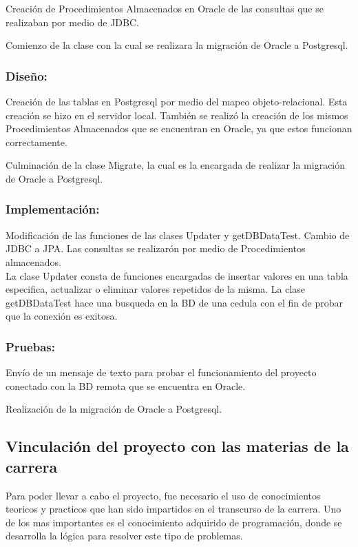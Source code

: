 \documentclass[spanish]{article}
\begin{document}
Creación de Procedimientos Almacenados en Oracle de las consultas que se realizaban por medio de JDBC. 

Comienzo de la clase con la cual se realizara la migración de Oracle a Postgresql.

\subsubsection{Diseño:}

Creación de las tablas en Postgresql por medio del mapeo objeto-relacional. Esta creación se hizo en el servidor local. También se realizó la creación de los mismos Procedimientos Almacenados que se encuentran en Oracle, ya que estos funcionan correctamente.  

Culminación de la clase Migrate, la cual es la encargada de realizar la migración de Oracle a Postgresql.

\subsubsection{Implementación:}

Modificación de las funciones de las clases Updater y getDBDataTest. Cambio de JDBC a JPA. Las consultas se realizarón por medio de Procedimientos almacenados.\\
 
La clase Updater consta de funciones encargadas de insertar valores en una tabla especifica, actualizar o eliminar valores repetidos de la misma. La clase getDBDataTest hace una busqueda en la BD de una cedula con el fin de probar que la conexión es exitosa.

\subsubsection{Pruebas:}

Envío de un mensaje de texto para probar el funcionamiento del proyecto conectado con la BD remota que se encuentra en Oracle.
  
Realización de la migración de Oracle a Postgresql.

\subsection{Vinculación del proyecto con las materias de la carrera}

Para poder llevar a cabo el proyecto, fue necesario el uso de conocimientos teoricos y practicos que han sido impartidos en el transcurso de la carrera. Uno de los mas importantes es el conocimiento adquirido de programación, donde se desarrolla la lógica para resolver este tipo de problemas. 
\end{document}

